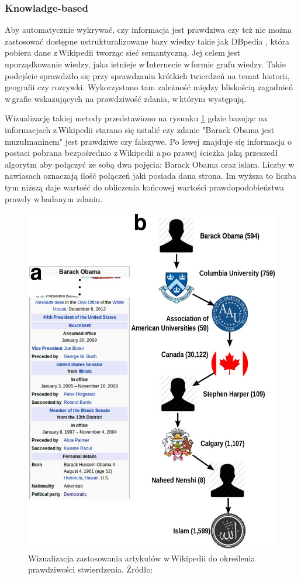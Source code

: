 \subsubsection{Knowladge-based}
Aby automatycznie wykrywać, czy informacja jest prawdziwa czy też nie można zastosować dostępne ustrukturalizowane bazy wiedzy takie jak DBpedia , która pobiera dane z\,Wikipedii tworząc sieć semantyczną. Jej celem jest uporządkowanie wiedzy, jaka istnieje w\,Internecie w\,formie grafu wiedzy.  Takie podejście sprawdziło się przy sprawdzaniu krótkich twierdzeń na temat historii, geografii czy rozrywki\cite{ciampaglia2015computational}. Wykorzystano tam zależność między bliskością zagadnień w\,grafie wskazujących na prawdziwość zdania, w\,którym występują.
\par 
Wizualizację takiej metody przedstawiono na rysunku \ref{fig:barackObama} gdzie bazując na informacjach z\,Wikipedii starano się ustalić czy zdanie "Barack Obama jest muzułmaninem" jest prawdziwe czy fałszywe. Po lewej znajduje się informacja o postaci pobrana bezpośrednio z\,Wikipedii a\,po prawej ścieżka jaką przeszedł algorytm aby połączyć ze sobą dwa pojęcia: Barack Obama oraz islam. Liczby w\,nawiasach oznaczają ilość połączeń jaki posiada dana strona. Im wyższa to liczba tym niższą daje wartość do obliczenia końcowej wartości prawdopodobieństwa prawdy w\,badanym zdaniu. 

\begin{figure}[!h]
	\centering \includegraphics[width=0.5\linewidth]{img/barackObamaIsAMuslimNew.jpg}
	\caption{Wizualizacja zastosowania artykułów w\,Wikipedii do określenia prawdziwości stwierdzenia. Źródło: \cite{ciampaglia2015computational}}
	\label{fig:barackObama}
\end{figure}
\par

